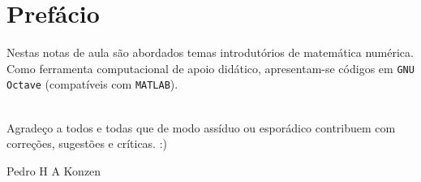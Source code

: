 

\chapter*{Prefácio}\label{prefacio}

Nestas notas de aula são abordados temas introdutórios de matemática numérica. Como ferramenta computacional de apoio didático, apresentam-se códigos em \verb+GNU Octave+ (compatíveis com \verb+MATLAB+).

~\\

Agradeço a todos e todas que de modo assíduo ou esporádico contribuem com correções, sugestões e críticas. :)

\begin{flushright}
  Pedro H A Konzen
\end{flushright}

